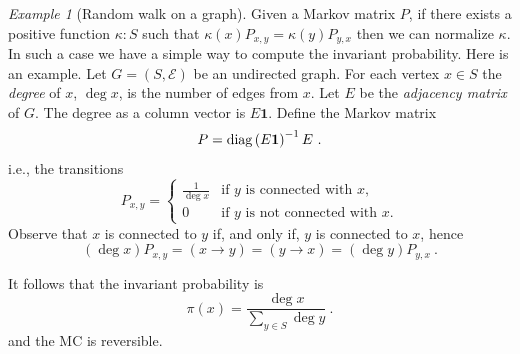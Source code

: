 \documentclass[12pt,a4paper]{amsart}
\newcommand{\one}{\bm 1}
\theoremstyle{plain}%
\theoremstyle{definition}
\theoremstyle{remark}
\newtheorem{example}{Example}
\begin{document}
\begin{example}[Random walk on a graph]
Given a Markov matrix $P$, if there exists a positive function $\kappa \colon S$ such that $\kappa(x)P_{x,y} = \kappa(y)P_{y,x}$ then we can normalize $\kappa$. In such a case we have a simple way to compute the invariant probability. 
Here is an example. Let $G = (S,\mathcal E)$ be an undirected graph. For each vertex $x \in S$ the \emph{degree} of $x$, $\deg x$, is the number of edges from $x$. Let $E$ be the \emph{adjacency matrix} of $G$. The degree as a column vector is $E \one$. Define the Markov matrix
\begin{equation*}
  P = \diagof{E \one}^{-1} E \ . 
\end{equation*}
i.e., the transitions
\begin{equation*}
 P_{x,y} = \begin{cases}
   \frac 1 {\deg x} & \text{if $y$ is connected with $x$,} \\
   0 & \text{if $y$ is not connected with $x$.}
  \end{cases}
\end{equation*}
Observe that $x$ is connected to $y$ if, and only if, $y$ is connected to $x$, hence
\begin{equation*}
  (\deg x) P_{x,y} = (x \to y) = (y \to x) = (\deg y) P_{y,x} \ .
\end{equation*}

It follows that the invariant probability is
\begin{equation*}
  \pi(x) = \frac{\deg x}{\sum_{y \in S} \deg y} \ .
\end{equation*}
and the MC is reversible.
\end{example}
\end{document}

